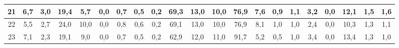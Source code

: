 \begin{sidewaystable}[]
\begin{tabular}{|c|c|c|c|c|c|c|c|c|c|c|c|c|c|c|c|c|c|c|c|c|}
    21 & 6,7                                              & 3,0                                              & 19,4                                             & 5,7                                              & 0,0                                              & 0,7                                              & 0,5                                              & 0,2                                              & 69,3                                            & 13,0                                            & 10,0                                            & 76,9                                            & 7,6                                             & 0,9                                             & 1,1                                             & 3,2                                             & 0,0                                             & 12,1                                             & 1,5                                              &  1,6                                               \\ \hline
    22 & 5,5                                              & 2,7                                              & 24,0                                             & 10,0                                             & 0,0                                              & 0,8                                              & 0,6                                              & 0,2                                              & 69,1                                            & 13,0                                            & 10,0                                            & 76,9                                            & 8,1                                             & 1,0                                             & 1,0                                             & 2,4                                             & 0,0                                             & 10,3                                             & 1,3                                              &  1,1                                               \\ \hline
    23 & 7,1                                              & 2,3                                              & 19,1                                             & 9,0                                              & 0,0                                              & 0,7                                              & 0,5                                              & 0,2                                              & 62,9                                            & 12,0                                            & 11,0                                            & 91,7                                            & 5,2                                             & 0,5                                             & 1,0                                             & 3,4                                             & 0,0                                             & 13,4                                             & 1,3                                              &  1,0                                               \\ \hline

\end{tabular}
\end{sidewaystable}
